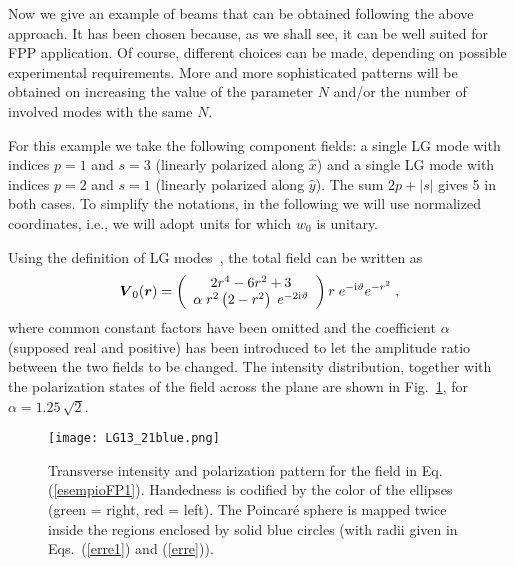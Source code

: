 \documentclass{article}
\newcommand{\bs}{\boldsymbol}
\begin{document}
Now we give an example of beams that can be obtained following the above approach. It has been chosen because, as we shall see, it can be well suited for FPP application. Of course, different choices can be made, depending on possible experimental requirements. More and more sophisticated patterns will be obtained on increasing the value of the parameter $N$ and/or the number of involved modes with the same $N$.

For this example we take the following component fields: a single LG mode with indices $p=1$ and $s=3$ (linearly polarized along $\hat x$) and a single LG mode with indices $p=2$ and $s=1$ (linearly polarized along $\hat y$). The sum $2 p + |s|$ gives 5 in both cases. To simplify the notations, in the following we will use normalized coordinates, i.e., we will adopt units for which $w_0$ is unitary.

Using the definition of LG modes~\cite{Siegman:Lasers86}, the total field can be written as
%
\begin{equation}
{\bs V}_{0}({\bs r}) 
= 
\left(
\begin{array}{c}
2 r^4 -6 r^2+3
\\ 
\alpha \; r^2 \left( 2 - r^2\right) \; e^{-2 {\rm i} \vartheta}
\end{array}
\right)
r \; e^{- {\rm i} \vartheta} e^{-r^2}
\; ,
\label{esempioFP1}
\end{equation}
%
where common constant factors have been omitted and the coefficient $\alpha$ (supposed real and positive) has been introduced to let the amplitude ratio between the two fields to be changed. 
The intensity distribution, together with the polarization states of the field across the plane are shown in Fig.~\ref{figFP2}, for $\alpha=1.25 \, \sqrt{2}$. 
%
\begin{figure}[ht]
	\centering
	\texttt{[image: LG13\_21blue.png]}	
	\caption{Transverse intensity and polarization pattern for the field in Eq. (\ref{esempioFP1}).  Handedness is codified by the color of the ellipses (green = right, red = left). The Poincar\'e sphere is mapped twice inside the regions enclosed by solid blue circles (with radii given in Eqs.~(\ref{erre1}) and (\ref{erre})).}
	\label{figFP2}
\end{figure}
%
\end{document}
